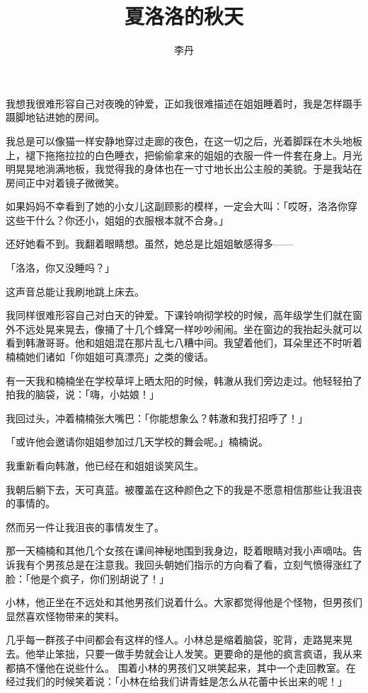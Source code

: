 \documentclass[UTF8]{ctexart}
\title{夏洛洛的秋天}
\author{李丹}
\date{}
\begin{document}
\maketitle

\newpage

我想我很难形容自己对夜晚的钟爱，正如我很难描述在姐姐睡着时，我是怎样蹑手蹑脚地钻进她的房间。

我总是可以像猫一样安静地穿过走廊的夜色，在这一切之后，光着脚踩在木头地板上，褪下拖拖拉拉的白色睡衣，把偷偷拿来的姐姐的衣服一件一件套在身上。月光明晃晃地淌满地板，我觉得我的身体也在一寸寸地长出公主般的美貌。于是我站在房间正中对着镜子微微笑。

如果妈妈不幸看到了她的小女儿这副顾影的模样，一定会大叫：「哎呀，洛洛你穿这些干什么？你还小，姐姐的衣服根本就不合身。」

还好她看不到。我翻着眼睛想。虽然，她总是比姐姐敏感得多——

「洛洛，你又没睡吗？」

这声音总能让我刷地跳上床去。

我同样很难形容自己对白天的钟爱。下课铃响彻学校的时候，高年级学生们就在窗外不远处晃来晃去，像捅了十几个蜂窝一样吵吵闹闹。坐在窗边的我抬起头就可以看到韩澈哥哥。他和姐姐混在那片乱七八糟中间。我望着他们，耳朵里还不时听着楠楠她们诸如「你姐姐可真漂亮」之类的傻话。

有一天我和楠楠坐在学校草坪上晒太阳的时候，韩澈从我们旁边走过。他轻轻拍了拍我的脑袋，说：「嗨，小姑娘！」

我回过头，冲着楠楠张大嘴巴：「你能想象么？韩澈和我打招呼了！」

「或许他会邀请你姐姐参加过几天学校的舞会呢。」楠楠说。

我重新看向韩澈，他已经在和姐姐谈笑风生。

我朝后躺下去，天可真蓝。被覆盖在这种颜色之下的我是不愿意相信那些让我沮丧的事情的。

然而另一件让我沮丧的事情发生了。

那一天楠楠和其他几个女孩在课间神秘地围到我身边，眨着眼睛对我小声嘀咕。告诉我有个男孩总是在注意我。我回头朝她们指示的方向看了看，立刻气愤得涨红了脸：「他是个疯子，你们别胡说了！」

小林，他正坐在不远处和其他男孩们说着什么。大家都觉得他是个怪物，但男孩们显然喜欢怪物带来的笑料。

几乎每一群孩子中间都会有这样的怪人。小林总是缩着脑袋，驼背，走路晃来晃去。他举止笨拙，只要一做手势就会让人发笑。更要命的是他的疯言疯语，我从来都搞不懂他在说些什么。
围着小林的男孩们又哄笑起来，其中一个走回教室。在经过我们的时候笑着说：「小林在给我们讲青蛙是怎么从花蕾中长出来的呢！」
\end{document}
